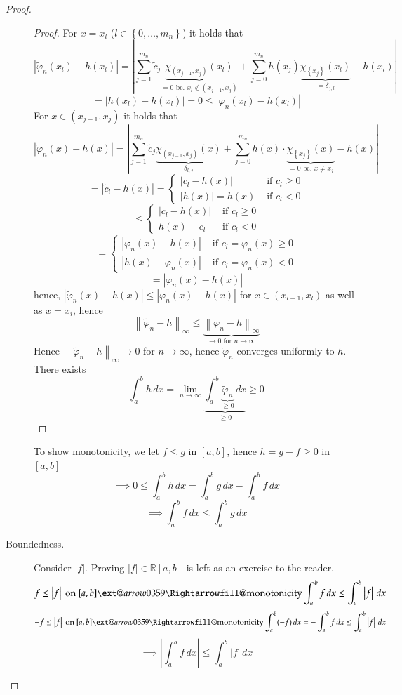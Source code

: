 \documentclass{article}
\makeatletter
\newcommand{\set}[1]{\left\{#1\right\}}
\newcommand{\norm}[1]{\left\|#1\right\|}
\newcommand{\card}[1]{\left|#1\right|}
\newcommand{\xRightarrow}[2][]{\ext@arrow 0359\Rightarrowfill@{#1}{#2}}
\makeatother
\begin{document}
\begin{proof}
\begin{description}
\begin{proof}
        For $x = x_l$ ($l \in \set{0, \dots, m_n}$) it holds that
        \[
          \card{\tilde \varphi_n(x_l) - h(x_l)}
            = \card{\sum_{j=1}^{m_n} \tilde c_j \underbrace{\chi_{(x_{j-1}, x_j)}(x_l)}_{=0 \text{ bc. } x_l \not\in (x_{j-1}, x_j)} + \sum_{j=0}^{m_n} h(x_j) \underbrace{\chi_{\set{x_j}}(x_l)}_{= \delta_{j,l}} - h(x_l)}
        \] \[
          = \card{h(x_l) - h(x_l)} = 0 \leq \card{\varphi_n(x_l) - h(x_l)}
        \]
        For $x \in (x_{j-1}, x_j)$ it holds that
        \[
          \card{\tilde\varphi_n(x) - h(x)}
            = \card{\sum_{j=1}^{m_n} \tilde c_j \underbrace{\chi_{(x_{j-1}, x_j)}(x)}_{\delta_{l,j}} + \sum_{j=0}^{m_n} h(x) \cdot \underbrace{\chi_{\set{x_j}}(x)}_{=0 \text{ bc. } x \neq x_j} - h(x)}
        \] \[
          = \card{\tilde c_l - h(x)}
          = \begin{cases}
            \card{c_l - h(x)} & \text{ if } c_l \geq 0 \\
            \card{h(x)} = h(x) & \text{ if } c_l < 0
          \end{cases}
        \] \[
          \leq \begin{cases}
            \card{c_l - h(x)} & \text{ if } c_l \geq 0 \\
            h(x) - c_l & \text{ if } c_l < 0
          \end{cases}
        \] \[
          = \begin{cases}
            \card{\varphi_n(x) - h(x)} & \text{ if } c_l = \varphi_n(x) \geq 0 \\
            \card{h(x) - \varphi_n(x)} & \text{ if } c_l = \varphi_n(x) < 0
          \end{cases}
        \] \[
          = \card{\varphi_n(x) - h(x)}
        \]
        hence, $\card{\tilde\varphi_n(x) - h(x)} \leq \card{\varphi_n(x) - h(x)}$
        for $x \in (x_{l-1}, x_l)$ as well as $x = x_i$,
        hence
        \[ \norm{\tilde\varphi_n - h}_{\infty} \leq \underbrace{\norm{\varphi_n - h}_{\infty}}_{\to 0 \text{ for } n \to \infty} \]
        Hence $\norm{\tilde\varphi_n - h}_{\infty} \to 0$ for $n \to \infty$, hence $\tilde\varphi_n$ converges uniformly to $h$.
        There exists
        \[ \int_a^b h \, dx = \lim_{n\to\infty} \underbrace{\int_a^b \underbrace{\tilde\varphi_n}_{\geq 0} \, dx}_{\geq 0} \geq 0 \]
      \end{proof}

      To show monotonicity, we let $f \leq g$ in $[a,b]$, hence $h = g - f \geq 0$ in $[a,b]$
      \[ \implies 0 \leq \int_a^b h \, dx = \int_a^b g \, dx - \int_a^b f \, dx \]
      \[ \implies \int_a^b f \, dx \leq \int_a^b g \, dx \]
    \item[Boundedness.]
      Consider $\card{f}$. Proving $\card{f} \in \mathbb R[a,b]$ is left as an exercise to the reader.
      \[ f \leq \card{f} \text{ on } [a,b] \xRightarrow{\text{monotonicity}} \int_a^b f \, dx \leq \int_a^b \card{f} \, dx \]
      \[ -f \leq \card{f} \text{ on } [a,b] \xRightarrow{\text{monotonicity}} \int_a^b (-f) \, dx = -\int_a^b f \, dx \leq \int_a^b \card{f} \, dx \]
      \[ \implies \card{\int_a^b f \, dx} \leq \int_a^b \card{f} \, dx \]
  \end{description}
\end{proof}
\end{document}
